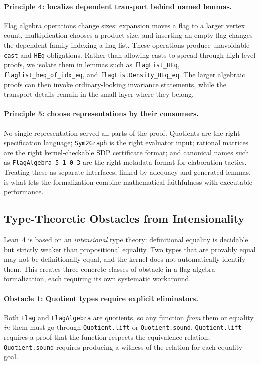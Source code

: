 \documentclass{article}
\newcommand{\lean}[1]{\texttt{#1}}
\begin{document}
\paragraph{Principle 4: localize dependent transport behind named lemmas.}
Flag algebra operations change sizes: expansion moves a flag to a larger
vertex count, multiplication chooses a product size, and inserting an empty
flag changes the dependent family indexing a flag list.  These operations
produce unavoidable \lean{cast} and \lean{HEq} obligations.  Rather than
allowing casts to spread through high-level proofs, we isolate them in lemmas
such as \lean{flagList\_HEq}, \lean{flaglist\_heq\_of\_idx\_eq}, and
\lean{flagListDensity\_HEq\_eq}.  The larger algebraic proofs can then invoke
ordinary-looking invariance statements, while the transport details remain in
the small layer where they belong.

\paragraph{Principle 5: choose representations by their consumers.}
No single representation served all parts of the proof.  Quotients are the
right specification language; \lean{Sym2Graph} is the right evaluator input;
rational matrices are the right kernel-checkable SDP certificate format; and
canonical names such as \lean{FlagAlgebra\_5\_1\_0\_3} are the right metadata
format for elaboration tactics.  Treating these as separate interfaces, linked
by adequacy and generated lemmas, is what lets the formalization combine
mathematical faithfulness with executable performance.


\subsection{Type-Theoretic Obstacles from Intensionality}
\label{sec:intensional}

Lean~4 is based on an \emph{intensional} type theory: definitional equality is
decidable but strictly weaker than propositional equality.  Two types that are
provably equal may not be definitionally equal, and the kernel does not
automatically identify them.  This creates three concrete classes of obstacle
in a flag algebra formalization, each requiring its own systematic workaround.

\paragraph{Obstacle 1: Quotient types require explicit eliminators.}
Both \lean{Flag} and \lean{FlagAlgebra} are quotients, so any function
\emph{from} them or equality \emph{in} them must go through
\lean{Quotient.lift} or \lean{Quotient.sound}.  \lean{Quotient.lift} requires
a proof that the function respects the equivalence relation; \lean{Quotient.sound}
requires producing a witness of the relation for each equality goal.
\end{document}
